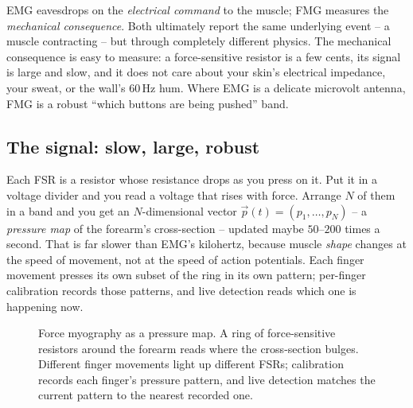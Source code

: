 \begin{intuitionbox}
EMG eavesdrops on the \emph{electrical command} to the muscle; FMG measures the
\emph{mechanical consequence}. Both ultimately report the same underlying event -- a
muscle contracting -- but through completely different physics. The mechanical
consequence is easy to measure: a force-sensitive resistor is a few
cents, its signal is large and slow, and it does not care about your skin's electrical
impedance, your sweat, or the wall's $60$\,Hz hum. Where EMG is a delicate
microvolt antenna, FMG is a robust ``which buttons are being pushed'' band.
\end{intuitionbox}

\subsection{The signal: slow, large, robust}
\label{ch37:fmg-signal}

Each FSR is a resistor whose resistance drops as you press on it. Put it in a voltage
divider and you read a voltage that rises with force. Arrange $N$ of them in a band
and you get an $N$-dimensional vector $\vec{p}(t) = (p_1,\dots,p_N)$ -- a
\emph{pressure map} of the forearm's cross-section -- updated maybe $50$--$200$ times
a second. That is far slower than EMG's kilohertz, because muscle \emph{shape} changes
at the speed of movement, not at the speed of action potentials. Each finger movement
presses its own subset of the ring in its own pattern; per-finger calibration records
those patterns, and live detection reads which one is happening now.

\begin{figure}[H]
\centering
{}
\caption{Force myography as a pressure map. A ring of force-sensitive resistors around
the forearm reads where the cross-section bulges. Different finger movements light up
different FSRs; calibration records each finger's pressure pattern, and live detection
matches the current pattern to the nearest recorded one.}
\label{ch37:fig-fmg-ring}
\end{figure}

